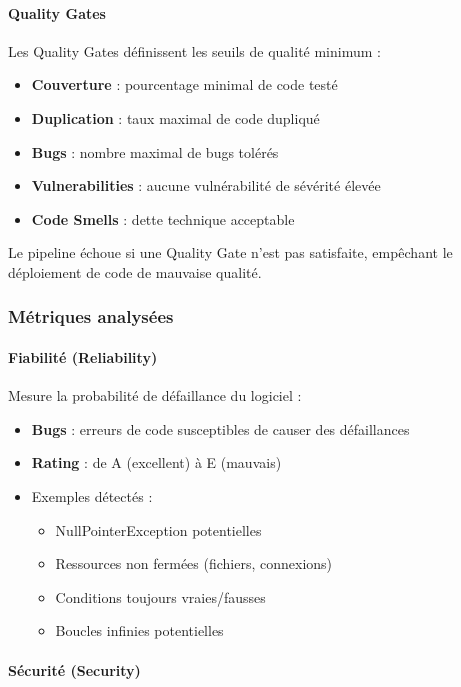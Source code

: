 \paragraph{Quality Gates}

Les Quality Gates définissent les seuils de qualité minimum :
\begin{itemize}
    \item \textbf{Couverture} : pourcentage minimal de code testé
    \item \textbf{Duplication} : taux maximal de code dupliqué
    \item \textbf{Bugs} : nombre maximal de bugs tolérés
    \item \textbf{Vulnerabilities} : aucune vulnérabilité de sévérité élevée
    \item \textbf{Code Smells} : dette technique acceptable
\end{itemize}

Le pipeline échoue si une Quality Gate n'est pas satisfaite, empêchant le déploiement de code de mauvaise qualité.

\subsubsection{Métriques analysées}

\paragraph{Fiabilité (Reliability)}

Mesure la probabilité de défaillance du logiciel :
\begin{itemize}
    \item \textbf{Bugs} : erreurs de code susceptibles de causer des défaillances
    \item \textbf{Rating} : de A (excellent) à E (mauvais)
    \item Exemples détectés :
    \begin{itemize}
        \item NullPointerException potentielles
        \item Ressources non fermées (fichiers, connexions)
        \item Conditions toujours vraies/fausses
        \item Boucles infinies potentielles
    \end{itemize}
\end{itemize}

\paragraph{Sécurité (Security)}

